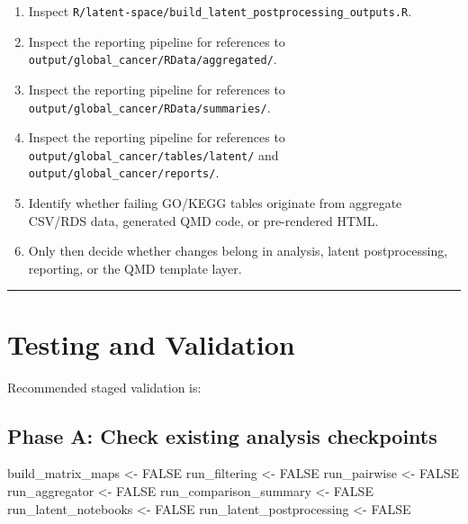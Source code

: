 \documentclass[
  letterpaper,
  DIV=11,
  numbers=noendperiod,
  openany,
  oneside]{scrreprt}
\newenvironment{Shaded}{\begin{snugshade}}{\end{snugshade}}
\newcommand{\ConstantTok}[1]{\textcolor[rgb]{0.56,0.35,0.01}{#1}}
\newcommand{\NormalTok}[1]{\textcolor[rgb]{0.00,0.23,0.31}{#1}}
\newcommand{\OtherTok}[1]{\textcolor[rgb]{0.00,0.23,0.31}{#1}}
\providecommand{\tightlist}{%
  \setlength{\itemsep}{0pt}\setlength{\parskip}{0pt}}
\begin{document}
\begin{enumerate}
\def\labelenumi{\arabic{enumi}.}
\tightlist
\item
  Inspect
  \texttt{R/latent-space/build\_latent\_postprocessing\_outputs.R}.
\item
  Inspect the reporting pipeline for references to
  \texttt{output/global\_cancer/RData/aggregated/}.
\item
  Inspect the reporting pipeline for references to
  \texttt{output/global\_cancer/RData/summaries/}.
\item
  Inspect the reporting pipeline for references to
  \texttt{output/global\_cancer/tables/latent/} and
  \texttt{output/global\_cancer/reports/}.
\item
  Identify whether failing GO/KEGG tables originate from aggregate
  CSV/RDS data, generated QMD code, or pre-rendered HTML.
\item
  Only then decide whether changes belong in analysis, latent
  postprocessing, reporting, or the QMD template layer.
\end{enumerate}

\begin{center}\rule{0.5\linewidth}{0.5pt}\end{center}

\section*{Testing and Validation}\label{testing-and-validation-1}


Recommended staged validation is:

\subsection*{Phase A: Check existing analysis
checkpoints}\label{phase-a-check-existing-analysis-checkpoints}

\begin{Shaded}
\begin{Highlighting}[]
\NormalTok{build\_matrix\_maps       }\OtherTok{\textless{}{-}} \ConstantTok{FALSE}
\NormalTok{run\_filtering           }\OtherTok{\textless{}{-}} \ConstantTok{FALSE}
\NormalTok{run\_pairwise            }\OtherTok{\textless{}{-}} \ConstantTok{FALSE}
\NormalTok{run\_aggregator          }\OtherTok{\textless{}{-}} \ConstantTok{FALSE}
\NormalTok{run\_comparison\_summary  }\OtherTok{\textless{}{-}} \ConstantTok{FALSE}
\NormalTok{run\_latent\_notebooks    }\OtherTok{\textless{}{-}} \ConstantTok{FALSE}
\NormalTok{run\_latent\_postprocessing }\OtherTok{\textless{}{-}} \ConstantTok{FALSE}
\end{Highlighting}
\end{Shaded}
\end{document}
